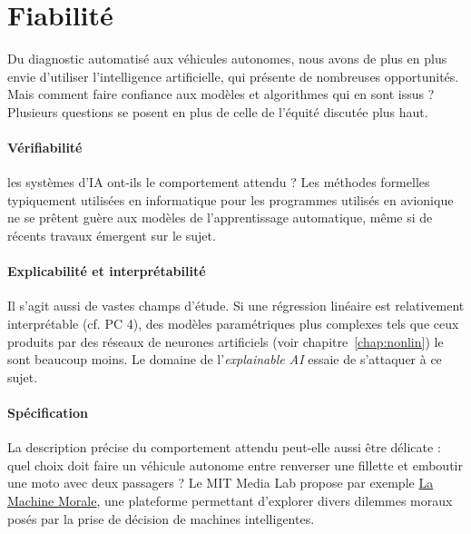\section{Fiabilité}
Du diagnostic automatisé aux véhicules autonomes, nous avons de plus en plus
envie d'utiliser l'intelligence artificielle, qui présente de nombreuses
opportunités. Mais comment faire confiance aux modèles et algorithmes qui en
sont issus ? Plusieurs questions se posent en plus de celle de l'équité
discutée plus haut.

\paragraph{Vérifiabilité} les systèmes d'IA ont-ils le comportement attendu ?
Les méthodes formelles typiquement utilisées en informatique pour les
programmes utilisés en avionique ne se prêtent guère aux modèles de
l'apprentissage automatique, même si de récents travaux émergent sur le sujet.

\paragraph{Explicabilité et interprétabilité} Il s'agit aussi de vastes champs
d'étude. Si une régression linéaire est relativement interprétable (cf. PC 4),
des modèles paramétriques plus complexes tels que ceux produits par des réseaux
de neurones artificiels (voir chapitre~\ref{chap:nonlin}) le
sont beaucoup moins. Le domaine de l'\textit{explainable AI} essaie de s'attaquer à ce sujet.

\paragraph{Spécification} La description précise du comportement attendu
peut-elle aussi être délicate : quel choix doit faire un véhicule autonome
entre renverser une fillette et emboutir une moto avec deux passagers ? Le MIT
Media Lab propose par exemple \href{http://moralmachine.mit.edu/hl/fr}{La
  Machine Morale}, une plateforme permettant d'explorer divers dilemmes moraux
posés par la prise de décision de machines intelligentes.

